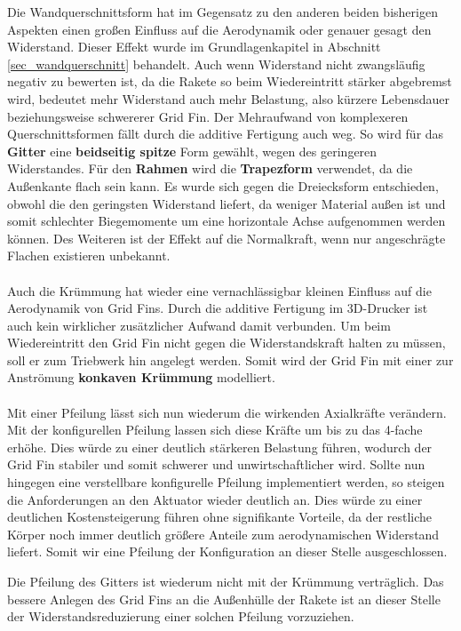 Die Wandquerschnittsform hat im Gegensatz zu den anderen beiden bisherigen Aspekten einen großen Einfluss auf die Aerodynamik oder genauer gesagt den Widerstand. Dieser Effekt wurde im Grundlagenkapitel in Abschnitt \ref{sec_wandquerschnitt} behandelt. Auch wenn Widerstand nicht zwangsläufig negativ zu bewerten ist, da die Rakete so beim Wiedereintritt stärker abgebremst wird, bedeutet mehr Widerstand auch mehr Belastung, also kürzere Lebensdauer beziehungsweise schwererer Grid Fin. Der Mehraufwand von komplexeren Querschnittsformen fällt durch die additive Fertigung auch weg. So wird für das \textbf{Gitter} eine \textbf{beidseitig spitze} Form gewählt, wegen des geringeren Widerstandes. Für den \textbf{Rahmen} wird die \textbf{Trapezform} verwendet, da die Außenkante flach sein kann. Es wurde sich gegen die Dreiecksform entschieden, obwohl die den geringsten Widerstand liefert, da weniger Material außen ist und somit schlechter Biegemomente um eine horizontale Achse aufgenommen werden können. Des Weiteren ist der Effekt auf die Normalkraft, wenn nur angeschrägte Flachen existieren unbekannt.
\\~\\
Auch die Krümmung hat wieder eine vernachlässigbar kleinen Einfluss auf die Aerodynamik von Grid Fins. Durch die additive Fertigung im 3D-Drucker ist auch kein wirklicher zusätzlicher Aufwand damit verbunden. Um beim Wiedereintritt den Grid Fin nicht gegen die Widerstandskraft halten zu müssen, soll er zum Triebwerk hin angelegt werden. Somit wird der Grid Fin mit einer zur Anströmung \textbf{konkaven Krümmung} modelliert.
\\~\\
Mit einer Pfeilung lässt sich nun wiederum die wirkenden Axialkräfte verändern. Mit der konfigurellen Pfeilung lassen sich diese Kräfte um bis zu das 4-fache erhöhe. Dies würde zu einer deutlich stärkeren Belastung führen, wodurch der Grid Fin stabiler und somit schwerer und unwirtschaftlicher wird. Sollte nun hingegen eine verstellbare konfigurelle Pfeilung implementiert werden, so steigen die Anforderungen an den Aktuator wieder deutlich an. Dies würde zu einer deutlichen Kostensteigerung führen ohne signifikante Vorteile, da der restliche Körper noch immer deutlich größere Anteile zum aerodynamischen Widerstand liefert. Somit wir eine Pfeilung der Konfiguration an dieser Stelle ausgeschlossen.

Die Pfeilung des Gitters ist wiederum nicht mit der Krümmung verträglich. Das bessere Anlegen des Grid Fins an die Außenhülle der Rakete ist an dieser Stelle der Widerstandsreduzierung einer solchen Pfeilung vorzuziehen.


